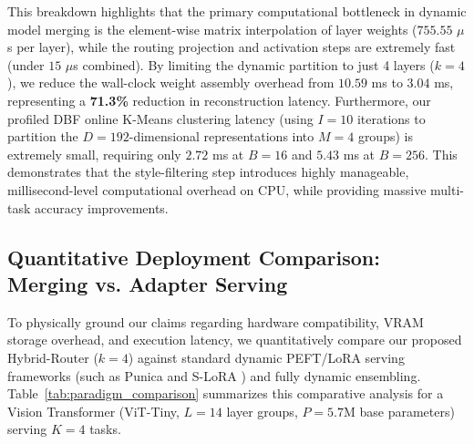 This breakdown highlights that the primary computational bottleneck in dynamic model merging is the element-wise matrix interpolation of layer weights ($755.55$ $\mu$s per layer), while the routing projection and activation steps are extremely fast (under $15$ $\mu$s combined). By limiting the dynamic partition to just 4 layers ($k=4$), we reduce the wall-clock weight assembly overhead from $10.59$ ms to $3.04$ ms, representing a \textbf{71.3\%} reduction in reconstruction latency. Furthermore, our profiled DBF online K-Means clustering latency (using $I=10$ iterations to partition the $D=192$-dimensional representations into $M=4$ groups) is extremely small, requiring only $2.72$ ms at $B=16$ and $5.43$ ms at $B=256$. This demonstrates that the style-filtering step introduces highly manageable, millisecond-level computational overhead on CPU, while providing massive multi-task accuracy improvements.

\subsection{Quantitative Deployment Comparison: Merging vs. Adapter Serving}
\label{sec:serving_comparison}
To physically ground our claims regarding hardware compatibility, VRAM storage overhead, and execution latency, we quantitatively compare our proposed Hybrid-Router ($k=4$) against standard dynamic PEFT/LoRA serving frameworks (such as Punica \cite{punica} and S-LoRA \cite{slora}) and fully dynamic ensembling. Table~\ref{tab:paradigm_comparison} summarizes this comparative analysis for a Vision Transformer (ViT-Tiny, $L=14$ layer groups, $P=5.7\text{M}$ base parameters) serving $K=4$ tasks.

